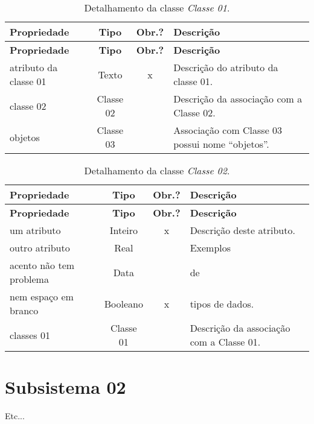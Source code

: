 \begin{longtable}{|p{3.5cm}|c|c|p{8cm}|}
	\caption{Detalhamento da classe \emph{Classe 01}.}
	\label{tbl-dicionario-subsistema-01-classe-01} \\\hline 
	
	\rowcolor{lightgray}
	\textbf{Propriedade} & \textbf{Tipo} & \textbf{Obr.?} & \textbf{Descrição} \\\hline
	\endfirsthead
	\hline
	\rowcolor{lightgray}
	\textbf{Propriedade} & \textbf{Tipo} & \textbf{Obr.?} & \textbf{Descrição} \\\hline
	\endhead
	
	atributo da classe 01 	& Texto 	& x & Descrição do atributo da classe 01. \\\hline
	classe 02 				& Classe 02 &	& Descrição da associação com a Classe 02. \\\hline 
	objetos 				& Classe 03 &	& Associação com Classe 03 possui nome ``objetos''. \\\hline 
\end{longtable}


\begin{longtable}{|p{3.5cm}|c|c|p{8cm}|}
	\caption{Detalhamento da classe \emph{Classe 02}.}
	\label{tbl-dicionario-subsistema-01-classe-02} \\\hline 
	
	\rowcolor{lightgray}
	\textbf{Propriedade} & \textbf{Tipo} & \textbf{Obr.?} & \textbf{Descrição} \\\hline
	\endfirsthead
	\hline
	\rowcolor{lightgray}
	\textbf{Propriedade} & \textbf{Tipo} & \textbf{Obr.?} & \textbf{Descrição} \\\hline
	\endhead
	
	um atributo				& Inteiro	& x & Descrição deste atributo. \\\hline
	outro atributo			& Real		& 	& Exemplos \\\hline
	acento não tem problema	& Data		& 	& de \\\hline
	nem espaço em branco	& Booleano	& x	& tipos de dados. \\\hline
	classes 01 				& Classe 01 &	& Descrição da associação com a Classe 01. \\\hline 
\end{longtable}



\section{Subsistema 02}
\label{sec-dicionario-subsistema-02}

Etc...